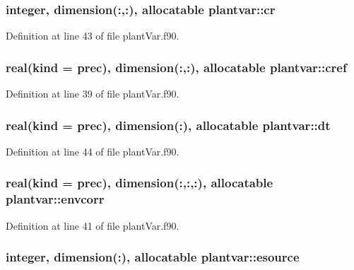 \hypertarget{classplantvar_a01620e31bb05f1443908f0bff75215a4}{
\subsubsection[{cr}]{\setlength{\rightskip}{0pt plus 5cm}integer, dimension(\-:,\-:), allocatable plantvar\-::cr}}\label{classplantvar_a01620e31bb05f1443908f0bff75215a4}


Definition at line 43 of file plant\-Var.\-f90.

\hypertarget{classplantvar_a5ddb9d753dc518aed9d34c9e1f5335e0}{
\subsubsection[{cref}]{\setlength{\rightskip}{0pt plus 5cm}real(kind = prec), dimension(\-:,\-:), allocatable plantvar\-::cref}}\label{classplantvar_a5ddb9d753dc518aed9d34c9e1f5335e0}


Definition at line 39 of file plant\-Var.\-f90.

\hypertarget{classplantvar_ae10871bcf2f4379bd15a518a314038de}{
\subsubsection[{dt}]{\setlength{\rightskip}{0pt plus 5cm}real(kind = prec), dimension(\-:), allocatable plantvar\-::dt}}\label{classplantvar_ae10871bcf2f4379bd15a518a314038de}


Definition at line 44 of file plant\-Var.\-f90.

\hypertarget{classplantvar_a187eaf8e3b46428daf4b89db350aa0f1}{
\subsubsection[{envcorr}]{\setlength{\rightskip}{0pt plus 5cm}real(kind = prec), dimension(\-:,\-:,\-:), allocatable plantvar\-::envcorr}}\label{classplantvar_a187eaf8e3b46428daf4b89db350aa0f1}


Definition at line 41 of file plant\-Var.\-f90.

\hypertarget{classplantvar_ac5590ecfa29690829feb06fd8c1eb839}{
\subsubsection[{esource}]{\setlength{\rightskip}{0pt plus 5cm}integer, dimension(\-:), allocatable plantvar\-::esource}}\label{classplantvar_ac5590ecfa29690829feb06fd8c1eb839}


